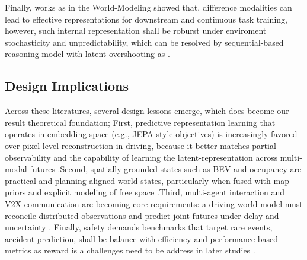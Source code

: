 Finally, works as \cite{DawidLeCun2024,LeCun2022, Assran2025} in the World-Modeling showed that, difference modalities can lead to effective representations for downstream and continuous task training, however, such internal representation shall be roburst under enviroment stochasticity and unpredictability, which can be resolved by sequential-based reasoning model with latent-overshooting as \cite{hafner_2019_learning}.



\subsection{Design Implications}

Across these literatures, several design lessons emerge, which does become our result theoretical foundation; First, predictive representation learning that operates in embedding space (e.g., JEPA-style objectives) is increasingly favored over pixel-level reconstruction in driving, because it better matches partial observability and the capability of learning the latent-representation across multi-modal futures \cite{LeCun2022,Zhu2025}.Second, spatially grounded states such as BEV and occupancy are practical and planning-aligned world states, particularly when fused with map priors and explicit modeling of free space \cite{Li2022,Li2025,Bogdoll2025}.Third, multi-agent interaction and V2X communication are becoming core requirements: a driving world model must reconcile distributed observations and predict joint futures under delay and uncertainty \cite{Xu2022,Xu2023,Tu2025}. Finally, safety demands benchmarks that target rare events, accident prediction, shall be balance with efficiency and performance based metrics as reward  is a challenges need to be address in later studies \cite{WangDeepAccident2023,Yan2025,Baraldi2025}.



